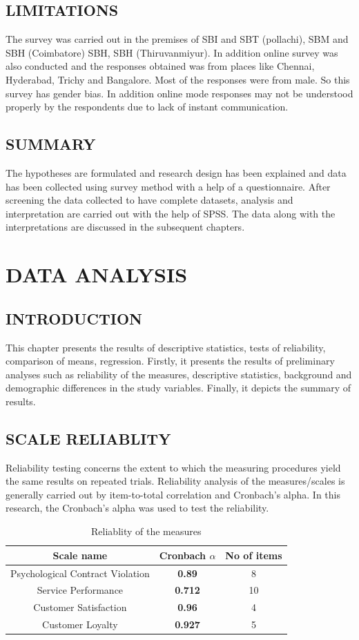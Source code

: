 \documentclass[a4paper, 12pt]{extarticle}
\begin{document}
{\subsection{LIMITATIONS}
The survey was carried out in the premises of SBI and SBT (pollachi), SBM and SBH (Coimbatore) SBH, SBH (Thiruvanmiyur). In addition online survey was also conducted and the responses obtained was from places like Chennai, Hyderabad, Trichy and Bangalore. Most of the responses were from male. So this survey has gender bias. In addition online mode responses may not be understood properly by the respondents due to lack of instant communication. 

\subsection{SUMMARY}
The hypotheses are formulated and research design has been explained and data has been collected using survey method with a help of a questionnaire. After screening the data collected to have complete datasets, analysis and interpretation are carried out with the help of SPSS. The data along with the interpretations are discussed in the subsequent chapters.

\newpage
\section{DATA ANALYSIS}
\subsection{INTRODUCTION}
This chapter presents the results of descriptive statistics, tests of reliability, comparison of means, regression. Firstly, it presents the results of preliminary analyses such as reliability of the measures, descriptive statistics, background and demographic differences in the study variables. Finally, it depicts the summary of results.

\subsection{SCALE RELIABLITY}
Reliability testing concerns the extent to which the measuring procedures yield the same results on repeated trials. Reliability analysis of the measures/scales is generally carried out by item-to-total correlation and Cronbach's alpha. In this research, the Cronbach's  alpha was used to test the reliability.
\begin{table}[H]
\centering
\begin{tabular}{|c|c|c|}
\hline
\textbf{Scale name} & \textbf{Cronbach $\alpha$} & \textbf{No of items}\\
\hline
Psychological Contract Violation & \textbf{0.89} & 8\\
\hline
Service Performance & \textbf{0.712} & 10\\
\hline
Customer Satisfaction & \textbf{0.96} & 4\\
\hline
Customer Loyalty & \textbf{0.927} & 5 \\
\hline
\end{tabular}
\caption{Reliablity of the measures}
\end{table}

}
\end{document}
